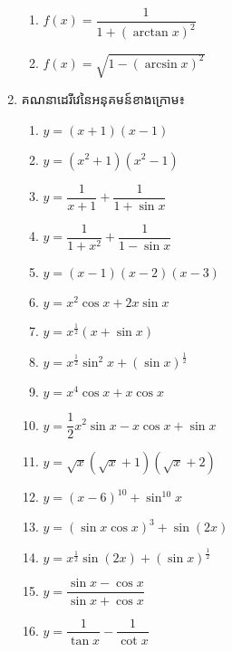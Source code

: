 \documentclass[a4paper,12pt]{article}
\begin{document}
\begin{enumerate}
\begin{multicols}{2}
\begin{enumerate}
			      \item $f(x)=\dfrac{1}{1+(\arctan x)^2}$
			      \item $f(x)= \sqrt{1-(\arcsin x)^2}$
		      \end{enumerate}
	      \end{multicols}
	\item គណនាដេរីវេនៃអនុគមន៍ខាងក្រោម៖
	      \begin{multicols}{2}
		      \begin{enumerate}
			      \item $y=(x+1)(x-1)$
			      \item $y=(x^2+1)(x^2-1)$
			      \item $y=\dfrac{1}{x+1}+\dfrac{1}{1+\sin x}$
			      \item $y=\dfrac{1}{1+x^2}+\dfrac{1}{1-\sin x}$
			      \item $y=(x-1)(x-2)(x-3)$
			      \item $y=x^2\cos x+2x\sin x$
			      \item $y=x^{\frac{1}{2}}(x+\sin x)$
			      \item $y=x^{\frac{1}{2}}\sin^2 x+(\sin x)^{\frac{1}{2}}$
			      \item $y=x^4 \cos x+x\cos x$
			      \item $y=\dfrac{1}{2}x^2\sin x-x\cos x+\sin x$
			      \item $y=\sqrt{x}(\sqrt{x}+1)(\sqrt{x}+2)$
			      \item $y=(x-6)^{10}+\sin^{10} x$
			      \item $y=(\sin x\cos x)^3+\sin (2x)$
			      \item $y=x^{\frac{1}{2}} \sin (2x) +(\sin x)^{\frac{1}{2}}$
			      \item $y=\dfrac{\sin x-\cos x}{\sin x+\cos x}$
			      \item $y=\dfrac{1}{\tan x}-\dfrac{1}{\cot x}$
		      \end{enumerate}
	      \end{multicols}
\end{enumerate}
\end{document}
